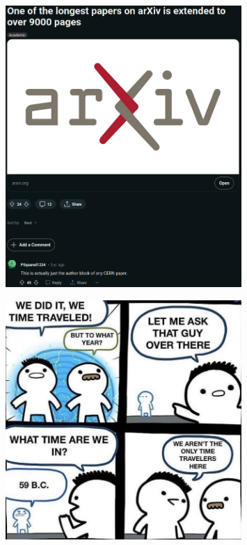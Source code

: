 \documentclass[a4paper]{article}
\begin{document}
\begin{figure}[htbp]
\centering
\includegraphics[width=0.8\textwidth]{meme-cern-paper.png}

\label{fig:meme-cern-paper}
\end{figure}

\begin{figure}[htbp]
\centering
\includegraphics[width=0.8\textwidth]{meme-time-travel.jpg}

\label{fig:meme-time-travel}
\end{figure}
\end{document}

